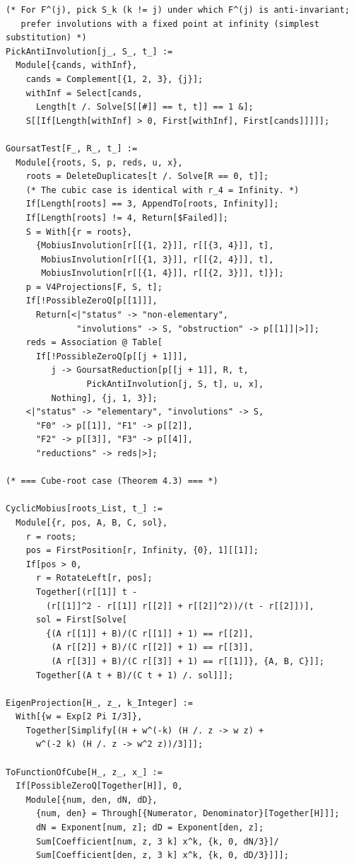 \documentclass[11pt,a4paper]{article}
\theoremstyle{plain}
\theoremstyle{definition}
\theoremstyle{remark}
\begin{document}
\begin{lstlisting}
(* For F^(j), pick S_k (k != j) under which F^(j) is anti-invariant;
   prefer involutions with a fixed point at infinity (simplest substitution) *)
PickAntiInvolution[j_, S_, t_] :=
  Module[{cands, withInf},
    cands = Complement[{1, 2, 3}, {j}];
    withInf = Select[cands,
      Length[t /. Solve[S[[#]] == t, t]] == 1 &];
    S[[If[Length[withInf] > 0, First[withInf], First[cands]]]]];

GoursatTest[F_, R_, t_] :=
  Module[{roots, S, p, reds, u, x},
    roots = DeleteDuplicates[t /. Solve[R == 0, t]];
    (* The cubic case is identical with r_4 = Infinity. *)
    If[Length[roots] == 3, AppendTo[roots, Infinity]];
    If[Length[roots] != 4, Return[$Failed]];
    S = With[{r = roots},
      {MobiusInvolution[r[[{1, 2}]], r[[{3, 4}]], t],
       MobiusInvolution[r[[{1, 3}]], r[[{2, 4}]], t],
       MobiusInvolution[r[[{1, 4}]], r[[{2, 3}]], t]}];
    p = V4Projections[F, S, t];
    If[!PossibleZeroQ[p[[1]]],
      Return[<|"status" -> "non-elementary",
              "involutions" -> S, "obstruction" -> p[[1]]|>]];
    reds = Association @ Table[
      If[!PossibleZeroQ[p[[j + 1]]],
         j -> GoursatReduction[p[[j + 1]], R, t,
                PickAntiInvolution[j, S, t], u, x],
         Nothing], {j, 1, 3}];
    <|"status" -> "elementary", "involutions" -> S,
      "F0" -> p[[1]], "F1" -> p[[2]],
      "F2" -> p[[3]], "F3" -> p[[4]],
      "reductions" -> reds|>];

(* === Cube-root case (Theorem 4.3) === *)

CyclicMobius[roots_List, t_] :=
  Module[{r, pos, A, B, C, sol},
    r = roots;
    pos = FirstPosition[r, Infinity, {0}, 1][[1]];
    If[pos > 0,
      r = RotateLeft[r, pos];
      Together[(r[[1]] t -
        (r[[1]]^2 - r[[1]] r[[2]] + r[[2]]^2))/(t - r[[2]])],
      sol = First[Solve[
        {(A r[[1]] + B)/(C r[[1]] + 1) == r[[2]],
         (A r[[2]] + B)/(C r[[2]] + 1) == r[[3]],
         (A r[[3]] + B)/(C r[[3]] + 1) == r[[1]]}, {A, B, C}]];
      Together[(A t + B)/(C t + 1) /. sol]]];

EigenProjection[H_, z_, k_Integer] :=
  With[{w = Exp[2 Pi I/3]},
    Together[Simplify[(H + w^(-k) (H /. z -> w z) +
      w^(-2 k) (H /. z -> w^2 z))/3]]];

ToFunctionOfCube[H_, z_, x_] :=
  If[PossibleZeroQ[Together[H]], 0,
    Module[{num, den, dN, dD},
      {num, den} = Through[{Numerator, Denominator}[Together[H]]];
      dN = Exponent[num, z]; dD = Exponent[den, z];
      Sum[Coefficient[num, z, 3 k] x^k, {k, 0, dN/3}]/
      Sum[Coefficient[den, z, 3 k] x^k, {k, 0, dD/3}]]];


\end{lstlisting}
\end{document}
